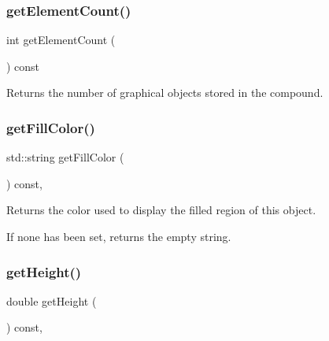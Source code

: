 \subsubsection{\texorpdfstring{get\+Element\+Count()}{getElementCount()}}
{\footnotesize\ttfamily int get\+Element\+Count (\begin{DoxyParamCaption}{ }\end{DoxyParamCaption}) const\hspace{0.3cm}{\ttfamily [virtual]}}



Returns the number of graphical objects stored in the compound. 

\mbox{\label{classsgl_1_1GObject_a76f6964a11fde7c78e9751be184e1a3c}} 
\subsubsection{\texorpdfstring{get\+Fill\+Color()}{getFillColor()}}
{\footnotesize\ttfamily std\+::string get\+Fill\+Color (\begin{DoxyParamCaption}{ }\end{DoxyParamCaption}) const\hspace{0.3cm}{\ttfamily [virtual]}, {\ttfamily [inherited]}}



Returns the color used to display the filled region of this object. 

If none has been set, returns the empty string. \mbox{\label{classsgl_1_1GObject_a1e7e353362434072875264cf95629f99}} 
\subsubsection{\texorpdfstring{get\+Height()}{getHeight()}}
{\footnotesize\ttfamily double get\+Height (\begin{DoxyParamCaption}{ }\end{DoxyParamCaption}) const\hspace{0.3cm}{\ttfamily [virtual]}, {\ttfamily [inherited]}}



